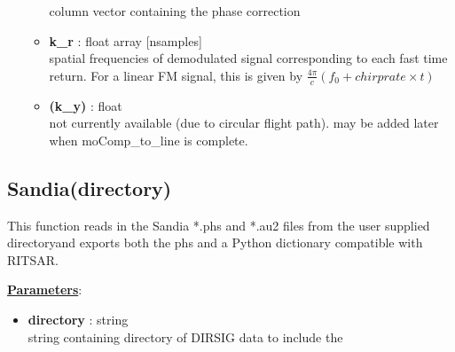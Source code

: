 \documentclass{article}
\newcommand{\defs}[2]{\textbf{{#1}} : {#2}}
\begin{document}
\begin{itemize}
\begin{itemize}
  	    	column vector containing the phase correction
   	    \item\defs{k\_r}{float array [nsamples]}\\
   	    	spatial frequencies of demodulated signal corresponding to each fast time return.  For a linear FM signal, this is given by $\frac{4\pi}{c}(f_0+chirprate\times t)$
		\item\defs{(k\_y)}{float}\\
   	    	not currently available (due to circular flight path).  may be added later when moComp\_to\_line is complete.
	  \end{itemize}
\end{itemize}

\subsection{Sandia(directory)}
This function reads in the Sandia *.phs and *.au2 files from the user supplied directoryand exports both the phs and a Python dictionary compatible with RITSAR.

\noindent \underline{\textbf{Parameters}}:
\begin{itemize}
  	\item \defs{directory}{string}\\
  		string containing directory of DIRSIG data to include the
\end{itemize}
\end{document}
